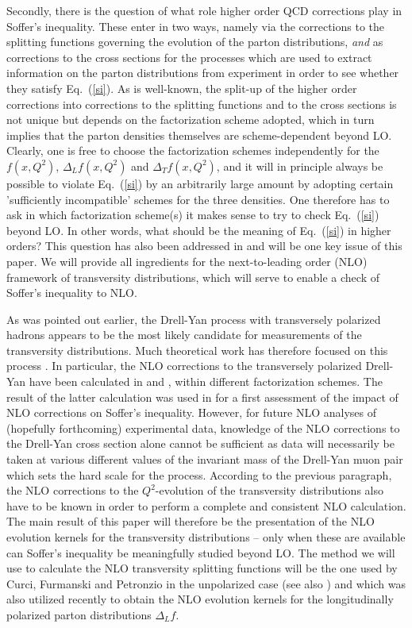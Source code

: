 Secondly, there is the question of what role higher order QCD corrections
play in Soffer's inequality. These enter in two ways, namely via the 
corrections to the splitting functions governing the evolution of the 
parton distributions, {\em and} as corrections to the cross sections for the 
processes which are used to extract information on the parton distributions 
from experiment in order to see whether they satisfy Eq.~(\ref{si}). As 
is well-known, the split-up of the higher order corrections into corrections
to the splitting functions and to the cross sections is not unique but depends 
on the factorization scheme adopted, which in turn implies that the parton
densities themselves are scheme-dependent beyond LO. Clearly, one is free 
to choose the factorization schemes independently for the $f(x,Q^2)$, 
$\Delta_L f(x,Q^2)$ and $\Delta_T f(x,Q^2)$, and it will in principle always 
be possible to violate Eq.~(\ref{si}) by an arbitrarily large amount by 
adopting certain 'sufficiently incompatible' schemes for the three densities. 
One therefore has to ask in which factorization scheme(s) it makes sense to 
try to check Eq.~(\ref{si}) 
beyond LO. In other words, what should be the meaning of Eq.~(\ref{si}) in 
higher orders? This question has also been addressed in \cite{cont2} and will 
be one key issue of this paper. We will provide all ingredients for the 
next-to-leading order (NLO) framework of transversity distributions, which 
will serve to enable a check of Soffer's inequality to NLO.

As was pointed out earlier, the Drell-Yan process with transversely polarized
hadrons appears to be the most likely candidate for measurements of the
transversity distributions. Much theoretical work has therefore focused on 
this process \cite{rs,am,jaffe,cortes,sivers,alex,cont1,dyrefs}. 
In particular, the NLO corrections to the transversely polarized Drell-Yan 
have been calculated in \cite{alex} and \cite{cont1,basim}, within 
different factorization schemes. The result of the latter calculation 
\cite{cont1,basim} was used in \cite{cont2} for a first 
assessment of the impact of NLO corrections on Soffer's inequality. 
However, for future NLO analyses of (hopefully forthcoming) experimental
data, knowledge of the NLO corrections to the Drell-Yan cross section
alone cannot be sufficient as data will necessarily be taken at various 
different values of the invariant mass of the Drell-Yan muon pair
which sets the hard scale for the process. According to the previous paragraph,
the NLO corrections to the $Q^2$-evolution of the transversity distributions
also have to be known in order to perform a complete and consistent NLO
calculation. The main result of this paper will therefore be the presentation 
of the NLO evolution kernels for the transversity distributions -- only when 
these are available can Soffer's inequality be meaningfully studied
beyond LO.
The method we will use to calculate the NLO transversity splitting functions  
will be the one used by Curci, Furmanski and Petronzio in the unpolarized 
case \cite{cfp,fp} (see also \cite{ev}) and which was also utilized 
recently \cite{wv} to obtain the NLO evolution kernels for the longitudinally 
polarized parton distributions $\Delta_L f$.    

